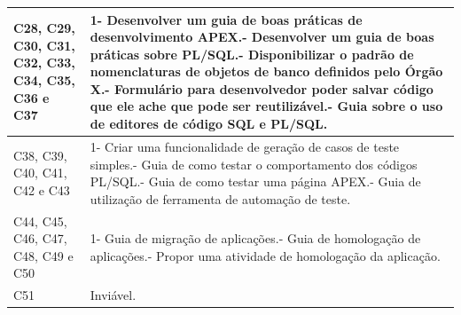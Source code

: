 \begin{longtable}{|M{2.0cm}|m{13.0cm}|}
C28, C29, C30, C31, C32, C33, C34, C35, C36 e C37 & 1- Desenvolver um guia de boas práticas de desenvolvimento APEX.- Desenvolver um guia de boas práticas sobre PL/SQL.- Disponibilizar o padrão de nomenclaturas de objetos de banco definidos pelo Órgão X.- Formulário para desenvolvedor poder salvar código que ele ache que pode ser reutilizável.- Guia sobre o uso de editores de código SQL e PL/SQL.                                                                                                                                       \\ \hline
C38, C39, C40, C41, C42 e C43                   & 1- Criar uma funcionalidade de geração de casos de teste simples.- Guia de como testar o comportamento dos códigos PL/SQL.- Guia de como testar uma página APEX.- Guia de utilização de ferramenta de automação de teste.                                                                                                                                                                                                                                                                               \\ \hline
C44, C45, C46, C47, C48, C49 e C50                & 1- Guia de migração de aplicações.- Guia de homologação de aplicações.- Propor uma atividade de homologação da aplicação.                                                                                                                                                                                                                                                                                                                                                                                   \\ \hline
C51                                              & Inviável.                                                                                                                                                                                                                                                                                                                                                                                                                                                                                                                                                      \\ \hline
\end{longtable}

